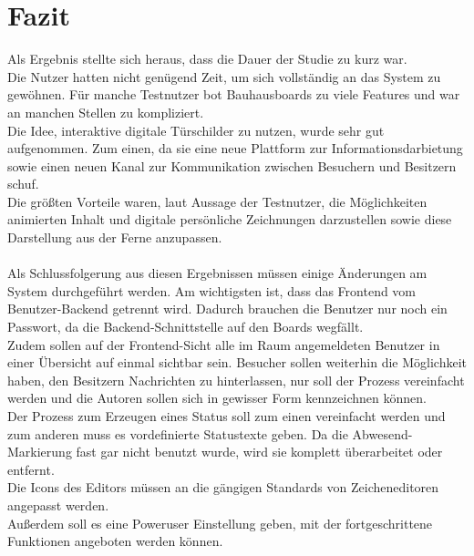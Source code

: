 \chapter{Fazit}\label{Fazit}
Als Ergebnis stellte sich heraus, dass die Dauer der Studie zu kurz war.
\\
Die Nutzer hatten nicht genügend Zeit, um sich vollständig an das System zu gewöhnen.
Für manche Testnutzer bot Bauhausboards zu viele Features und war an manchen Stellen zu kompliziert.
\\
Die Idee, interaktive digitale Türschilder zu nutzen, wurde sehr gut aufgenommen.
Zum einen, da sie eine neue Plattform zur Informationsdarbietung sowie einen neuen Kanal zur Kommunikation zwischen Besuchern und Besitzern schuf.
\\
Die größten Vorteile waren, laut Aussage der Testnutzer, die Möglichkeiten animierten Inhalt und digitale persönliche Zeichnungen darzustellen sowie diese Darstellung aus der Ferne anzupassen.
\\
\\
Als Schlussfolgerung aus diesen Ergebnissen müssen einige Änderungen am System durchgeführt werden.
Am wichtigsten ist, dass das Frontend vom Benutzer-Backend getrennt wird.
Dadurch brauchen die Benutzer nur noch ein Passwort, da die Backend-Schnittstelle auf den Boards wegfällt.
\\
Zudem sollen auf der Frontend-Sicht alle im Raum angemeldeten Benutzer in einer Übersicht auf einmal sichtbar sein.
Besucher sollen weiterhin die Möglichkeit haben, den Besitzern Nachrichten zu hinterlassen, nur soll der Prozess vereinfacht werden und die Autoren sollen sich in gewisser Form kennzeichnen können.
\\
Der Prozess zum Erzeugen eines Status soll zum einen vereinfacht werden und zum anderen muss es vordefinierte Statustexte geben.
Da die Abwesend-Markierung fast gar nicht benutzt wurde, wird sie komplett überarbeitet oder entfernt.
\\
Die Icons des Editors müssen an die gängigen Standards von Zeicheneditoren angepasst werden.
\\
Außerdem soll es eine Poweruser Einstellung geben, mit der fortgeschrittene Funktionen angeboten werden können.
